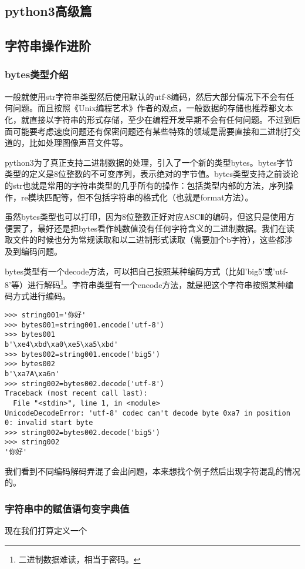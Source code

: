 \documentclass[12pt,oneside]{book}
\begin{document}
\begin{common-format}
\part{python3高级篇}
\chapter{字符串操作进阶}
\section{bytes类型介绍}
一般就使用str字符串类型然后使用默认的utf-8编码，然后大部分情况下不会有任何问题。而且按照《Unix编程艺术》作者的观点，一般数据的存储也推荐都文本化，就直接以字符串的形式存储，至少在编程开发早期不会有任何问题。不过到后面可能要考虑速度问题还有保密问题还有某些特殊的领域是需要直接和二进制打交道的，比如处理图像声音文件等。

python3为了真正支持二进制数据的处理，引入了一个新的类型bytes。bytes字节类型的定义是8位整数的不可变序列，表示绝对的字节值。bytes类型支持之前谈论的str也就是常用的字符串类型的几乎所有的操作：包括类型内部的方法，序列操作，re模块匹配等，但不包括字符串的格式化（也就是format方法）。

虽然bytes类型也可以打印，因为8位整数正好对应ASCⅡ的编码，但这只是使用方便罢了，最好还是把bytes看作纯数值没有任何字符含义的二进制数据。我们在读取文件的时候也分为常规读取和以二进制形式读取（需要加个b字符），这些都涉及到编码问题。

bytes类型有一个decode方法，可以把自己按照某种编码方式（比如'big5'或'utf-8'等）进行解码\footnote{二进制数据难读，相当于密码。}。字符串类型有一个encode方法，就是把这个字符串按照某种编码方式进行编码。
\begin{Verbatim}
>>> string001='你好'
>>> bytes001=string001.encode('utf-8')
>>> bytes001
b'\xe4\xbd\xa0\xe5\xa5\xbd'
>>> bytes002=string001.encode('big5')
>>> bytes002
b'\xa7A\xa6n'
>>> string002=bytes002.decode('utf-8')
Traceback (most recent call last):
  File "<stdin>", line 1, in <module>
UnicodeDecodeError: 'utf-8' codec can't decode byte 0xa7 in position 0: invalid start byte
>>> string002=bytes002.decode('big5')
>>> string002
'你好'
\end{Verbatim}
我们看到不同编码解码弄混了会出问题，本来想找个例子然后出现字符混乱的情况的。






\section{字符串中的赋值语句变字典值}
现在我们打算定义一个


\end{common-format}
\end{document}
